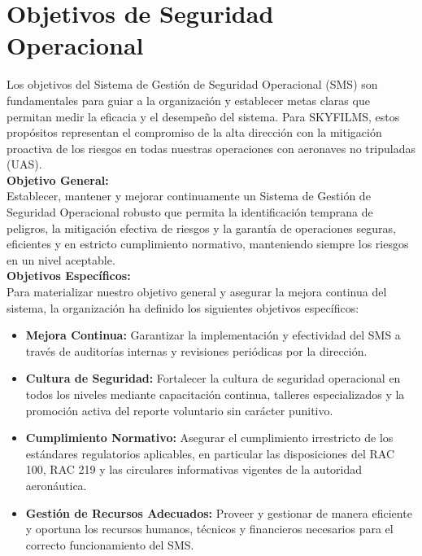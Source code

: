\section{Objetivos de Seguridad Operacional}
Los objetivos del Sistema de Gestión de Seguridad Operacional (SMS) son fundamentales para guiar a la organización y establecer metas claras que permitan medir la eficacia y el desempeño del sistema. Para SKYFILMS, estos propósitos representan el compromiso de la alta dirección con la mitigación proactiva de los riesgos en todas nuestras operaciones con aeronaves no tripuladas (UAS).\\

\textbf{Objetivo General:}\\
Establecer, mantener y mejorar continuamente un Sistema de Gestión de Seguridad Operacional robusto que permita la identificación temprana de peligros, la mitigación efectiva de riesgos y la garantía de operaciones seguras, eficientes y en estricto cumplimiento normativo, manteniendo siempre los riesgos en un nivel aceptable.\\

\textbf{Objetivos Específicos:}\\
Para materializar nuestro objetivo general y asegurar la mejora continua del sistema, la organización ha definido los siguientes objetivos específicos:

\begin{itemize}
    \item \textbf{Mejora Continua:} Garantizar la implementación y efectividad del SMS a través de auditorías internas y revisiones periódicas por la dirección.

    \item \textbf{Cultura de Seguridad:} Fortalecer la cultura de seguridad operacional en todos los niveles mediante capacitación continua, talleres especializados y la promoción activa del reporte voluntario sin carácter punitivo.

    \item \textbf{Cumplimiento Normativo:} Asegurar el cumplimiento irrestricto de los estándares regulatorios aplicables, en particular las disposiciones del RAC 100, RAC 219 y las circulares informativas vigentes de la autoridad aeronáutica.

    \item \textbf{Gestión de Recursos Adecuados:} Proveer y gestionar de manera eficiente y oportuna los recursos humanos, técnicos y financieros necesarios para el correcto funcionamiento del SMS.
\end{itemize}



